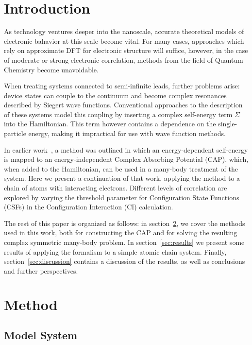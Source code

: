 \section{Introduction}

As technology ventures deeper into the nanoscale, accurate theoretical models
of electronic bahavior at this scale become vital. For many cases, approaches
which rely on approximate DFT for electronic structure will suffice, however,
in the case of moderate or strong electronic correlation, methods from the
field of Quantum Chemistry become unavoidable.

When treating systems connected to semi-infinite leads, further problems arise:
device states can couple to the continuum and become complex resonances
described by Siegert wave functions. Conventional approaches to the description
of these systems model this coupling by inserting a complex self-energy term
$\Sigma$ into the Hamiltonian. This term however contains a dependence on the
single-particle energy, making it impractical for use with wave function
methods.

In earlier work~\cite{henderson}, a method was outlined in which an
energy-dependent self-energy is mapped to an energy-independent Complex
Absorbing Potential (CAP), which, when added to the Hamiltonian, can be used
in a many-body treatment of the system. Here we present a continuation of that
work, applying the method to a chain of atoms with interacting electrons.
Different levels of correlation are explored by varying the threshold
parameter for Configuration State Functions (CSFs) in the Configuration
Interaction (CI) calculation.

The rest of this paper is organized as follows: in section~\ref{sec:method}, we
cover the methods used in this work, both for constructing the CAP and for
solving the resulting complex symmetric many-body problem. In
section~\ref{sec:results} we present some results of applying the formalism to
a simple atomic chain system. Finally, section~\ref{sec:discussion} contains a
discussion of the results, as well as conclusions and further perspectives.


\section{Method}
\label{sec:method}

\subsection{Model System}
\label{subsec:modelsystem}

